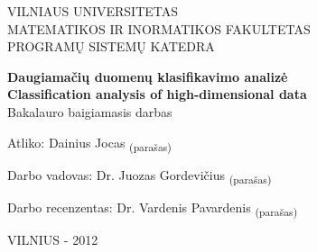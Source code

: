 \begin{titlepage}

\begin{center}
VILNIAUS UNIVERSITETAS\\
MATEMATIKOS IR INORMATIKOS FAKULTETAS\\
PROGRAMŲ SISTEMŲ KATEDRA\\
\vspace{150pt}

\huge \textbf{Daugiamačių duomenų klasifikavimo analizė\\}
\vspace{20pt}
\large\textbf{Classification analysis of high-dimensional data\\}
\vspace{20pt}
\small Bakalauro baigiamasis darbas\\
\vspace{40pt}
\end{center} 


\begin{flushleft}
Atliko: \hspace{50pt} Dainius Jocas \hspace{105pt}\textsubscript{(para\v{s}as)}

\vspace{10pt}
Darbo vadovas: \hspace{12pt} Dr. Juozas Gordevičius \hspace{65pt}\textsubscript{(para\v{s}as)}

\vspace{10pt}
Darbo recenzentas: Dr. Vardenis Pavardenis \hspace{50pt}\textsubscript{(para\v{s}as)}
\\
\vspace{130pt}
\end{flushleft}

\begin{center}
VILNIUS - 2012
\end{center}

\end{titlepage}